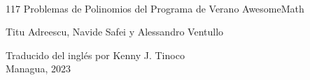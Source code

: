 \begin{titlepage}
    \begin{center}
        \ \\ \vspace{8cm}
        {\LARGE 117 Problemas de Polinomios del Programa de Verano AwesomeMath}

        \vspace{2cm}
        {\Large Titu Adreescu, Navide Safei y Alessandro Ventullo}

        \vfill
        {\large Traducido del inglés por Kenny J. Tinoco}\\
        \vspace{0.35cm}
        {\large Managua, 2023}

    \end{center}
\end{titlepage}